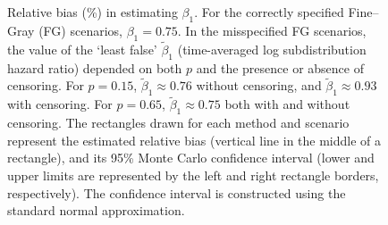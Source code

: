 \documentclass[
  letterpaper,
  paper=240mm:170mm,
  twoside=true,
  open=right,
  fontsize=10pt,
  pagesize=false,
  BCOR=15mm,
  DIV=14,
  headinclude=true,
  footinclude=false,
  headsepline=on]{scrbook}
\begin{document}
\begin{figure}


\caption{\label{fig-bias-X}Relative bias (\%) in estimating \(\beta_1\).
For the correctly specified Fine--Gray (FG) scenarios,
\(\beta_1 = 0.75\). In the misspecified FG scenarios, the value of the
`least false' \(\tilde{\beta}_1\) (time-averaged log subdistribution
hazard ratio) depended on both \(p\) and the presence or absence of
censoring. For \(p = 0.15\), \(\tilde{\beta}_1 \approx 0.76\) without
censoring, and \(\tilde{\beta}_1 \approx 0.93\) with censoring. For
\(p = 0.65\), \(\tilde{\beta}_1 \approx 0.75\) both with and without
censoring. The rectangles drawn for each method and scenario represent
the estimated relative bias (vertical line in the middle of a
rectangle), and its 95\% Monte Carlo confidence interval (lower and
upper limits are represented by the left and right rectangle borders,
respectively). The confidence interval is constructed using the standard
normal approximation.}

\end{figure}%
\end{document}
